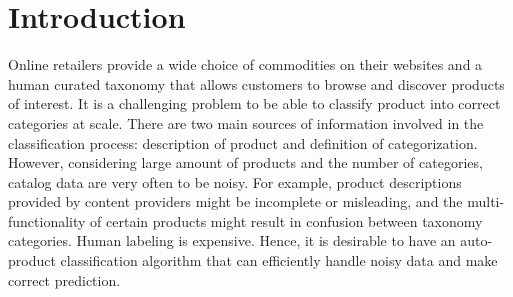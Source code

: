\documentclass[11pt,dvipsnames]{article}
\begin{document}

\section{Introduction}


Online retailers provide a wide choice of commodities on their websites and a human curated taxonomy that allows customers to browse and discover products of interest. It is a challenging problem to be able to classify product into correct categories at scale. There are two main sources of information involved in the classification process: description of product and definition of categorization. However, considering large amount of products and the number of categories, catalog data are very often to be noisy. For example, product descriptions provided by content providers might be incomplete or misleading, and the multi-functionality of certain products might result in confusion between taxonomy categories. Human labeling is expensive. Hence, it is desirable to have an auto-product classification algorithm that can efficiently handle noisy data and make correct prediction.
\end{document}
